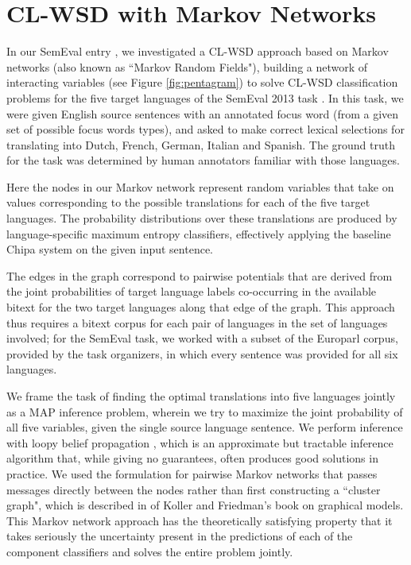 

\section{CL-WSD with Markov Networks}
\label{sec:multilingual-mrf}
In our SemEval entry \cite{rudnick-liu-gasser:2013:SemEval-2013}, we
investigated a CL-WSD approach based on Markov networks (also known as ``Markov
Random Fields"), building a network of interacting variables (see Figure
\ref{fig:pentagram}) to solve CL-WSD classification problems for the five
target languages of the SemEval 2013 task \cite{task10}. In this task, we were
given English source sentences with an annotated focus word (from a given set
of possible focus words types), and asked to make correct lexical selections
for translating into Dutch, French, German, Italian and Spanish. The ground
truth for the task was determined by human annotators familiar with those
languages.

Here the nodes in our Markov network represent random variables that take on
values corresponding to the possible translations for each of the five target
languages. The probability distributions over these translations are produced
by language-specific maximum entropy classifiers, effectively applying the
baseline Chipa system on the given input sentence.

The edges in the graph correspond to pairwise potentials that are derived from
the joint probabilities of target language labels co-occurring in the available
bitext for the two target languages along that edge of the graph. This approach
thus requires a bitext corpus for each pair of languages in the set of
languages involved; for the SemEval task, we worked with a subset of the
Europarl corpus, provided by the task organizers, in which every sentence was
provided for all six languages.

We frame the task of finding the optimal translations into five languages
jointly as a MAP inference problem, wherein we try to maximize the joint
probability of all five variables, given the single source language sentence.
We perform inference with loopy belief propagation
\cite{DBLP:conf/uai/MurphyWJ99}, which is an approximate but tractable
inference algorithm that, while giving no guarantees, often produces good
solutions in practice.
We used the formulation for pairwise Markov networks that passes messages
directly between the nodes rather than first constructing a ``cluster graph",
which is described in \cite[\S 11.3.5.1]{Koller+Friedman:09} of Koller and
Friedman's book on graphical models. This Markov network approach has the
theoretically satisfying property that it takes seriously the uncertainty
present in the predictions of each of the component classifiers and solves the
entire problem jointly. 

